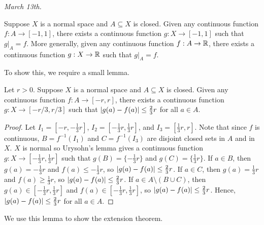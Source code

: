 \textit{March 13th.}

\begin{theorem}
    Suppose $X$ is a normal space and $A \subseteq X$ is closed. Given any continuous function $f : A \to [-1,1]$, there exists a continuous function $g: X \to [-1,1]$ such that $g|_{A} = f$. More generally, given any continuous function $f : A \to \mathbb{R}$, there exists a continuous function $g: X \to \mathbb{R}$ such that $g|_{A} = f$.
\end{theorem}

To show this, we require a small lemma.

\begin{lemma}
    Let $r > 0$. Suppose $X$ is a normal space and $A \subseteq X$ is closed. Given any continuous function $f : A \to [-r,r]$, there exists a continuous function $g: X \to [-r/3,r/3]$ such that $\left| g(a)-f(a) \right| \leq \frac{2}{3}r$ for all $a \in A$.
\end{lemma}

\begin{proof}
    Let $I_{1} = [-r,-\frac{1}{3}r]$, $I_{2} = [-\frac{1}{3}r,\frac{1}{3}r]$, and $I_{3} = [\frac{1}{3}r,r]$. Note that since $f$ is continuous, $B = f^{-1}(I_{1})$ and $C = f^{-1}(I_{3})$ are disjoint closed sets in $A$ and in $X$. $X$ is normal so Urysohn's lemma gives a continuous function $g: X \to [-\frac{1}{3}r,\frac{1}{3}r]$ such that $g(B) = \{-\frac{1}{3}r\}$ and $g(C) = \{\frac{1}{3}r\}$. If $a \in B$, then $g(a) = -\frac{1}{3}r$ and $f(a) \leq -\frac{1}{3}r$, so $\left| g(a)-f(a) \right| \leq \frac{2}{3}r$. If $a \in C$, then $g(a) = \frac{1}{3}r$ and $f(a) \geq \frac{1}{3}r$, so $\left| g(a)-f(a) \right| \leq \frac{2}{3}r$. If $a \in A \setminus (B \cup C)$, then $g(a) \in [-\frac{1}{3}r,\frac{1}{3}r]$ and $f(a) \in [-\frac{1}{3}r,\frac{1}{3}r]$, so $\left| g(a)-f(a) \right| \leq \frac{2}{3}r$. Hence, $\left| g(a)-f(a) \right| \leq \frac{2}{3}r$ for all $a \in A$.
\end{proof}

We use this lemma to show the extension theorem.

